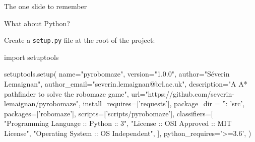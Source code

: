 \documentclass[compress]{beamer}
\begin{document}
\begin{frame}[fragile]{The one slide to remember}



\end{frame}

\begin{frame}[fragile]{What about Python?}

Create a \texttt{setup.py} file at the root of the project:
\begin{pythoncode}
import setuptools

setuptools.setup(
    name="pyrobomaze",
    version="1.0.0",
    author="Séverin Lemaignan",
    author_email="severin.lemaignan@brl.ac.uk",
    description="A A* pathfinder to solve the robomaze game",
    url="https://github.com/severin-lemaignan/pyrobomaze",
    install_requires=['requests'],
    package_dir = {'': 'src'},
    packages=['robomaze'],
    scripts=['scripts/pyrobomaze'],
    classifiers=[
        "Programming Language :: Python :: 3",
        "License :: OSI Approved :: MIT License",
        "Operating System :: OS Independent",
    ],
    python_requires='>=3.6',
)
\end{pythoncode}
\end{frame}

\end{document}
